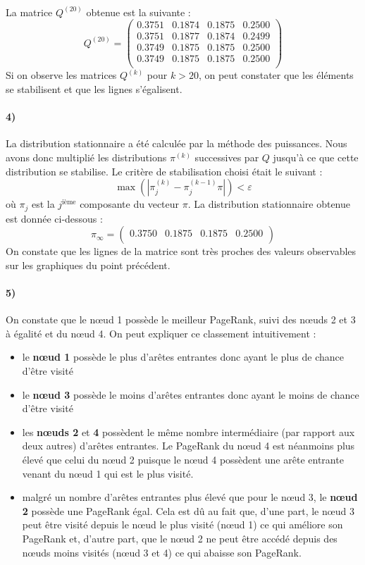 \documentclass[a4paper,titlepage]{report}
\begin{document}
\paragraph{}
La matrice $Q^{(20)}$ obtenue est la suivante :
\[
Q^{(20)} = 
\begin{pmatrix}
 0.3751 & 0.1874 & 0.1875 & 0.2500\\
 0.3751 & 0.1877 & 0.1874 & 0.2499\\
 0.3749 & 0.1875 & 0.1875 & 0.2500\\
 0.3749 & 0.1875 & 0.1875 & 0.2500\\
\end{pmatrix}
\]
Si on observe les matrices $Q^{(k)}$ pour $k> 20$, on peut constater que les éléments se stabilisent et que les lignes s'égalisent. 
\paragraph{4)} La distribution stationnaire a été calculée par la méthode des puissances. Nous avons donc multiplié les distributions $\pi^{(k)}$ successives par $Q$ jusqu'à ce que cette distribution se stabilise. Le critère de stabilisation choisi était le suivant : 
\[
\max\left(\left|\pi_j^{(k)} - \pi_j^{(k - 1)}\pi\right|\right) < \varepsilon
\]
où $\pi_j$ est la $j^{\text{ième}}$ composante du vecteur $\pi$. La distribution stationnaire obtenue est donnée ci-dessous :
\[
\pi_\infty = 
\begin{pmatrix}
0.3750 &
0.1875 &
0.1875 &
0.2500 \\
\end{pmatrix}
\]
On constate que les lignes de la matrice sont très proches des valeurs observables sur les graphiques du point précédent.
\paragraph{5)} On constate que le nœud 1 possède le meilleur PageRank, suivi des nœuds 2 et 3 à égalité et du nœud 4. On peut expliquer ce classement intuitivement : 
\begin{itemize}
	\item le \textbf{nœud 1} possède le plus d'arêtes entrantes donc ayant le plus de chance d'être visité
	\item le \textbf{nœud 3} possède le moins d'arêtes entrantes donc ayant le moins de chance d'être visité
	\item les \textbf{nœuds 2} et \textbf{4} possèdent le même nombre intermédiaire (par rapport aux deux autres) d'arêtes entrantes. Le PageRank du nœud 4 est néanmoins plus élevé que celui du nœud 2 puisque le nœud 4 possèdent une arête entrante venant du nœud 1 qui est le plus visité.
	\item malgré un nombre d'arêtes entrantes plus élevé que pour le nœud 3, le \textbf{nœud 2} possède une PageRank égal. Cela est dû au fait que, d'une part, le nœud 3 peut être visité depuis le nœud le plus visité (nœud 1) ce qui améliore son PageRank et, d'autre part, que le nœud 2 ne peut être accédé depuis des nœuds moins visités (nœud 3 et 4) ce qui abaisse son PageRank. 
\end{itemize} 
\end{document}
